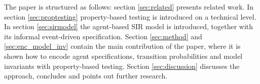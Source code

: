 The paper is structured as follows: section \ref{sec:related} presents related work. In section \ref{sec:proptesting} property-based testing is introduced on a technical level. In section \ref{sec:sirmodel} the agent-based SIR model is introduced, together with its informal event-driven specification. Section \ref{sec:method} and \ref{sec:enc_model_inv} contain the main contribution of the paper, where it is shown how to encode agent specifications, transition probabilities and model invariants with property-based testing. Section \ref{sec:discussion} discusses the approach, concludes and  points out further research.